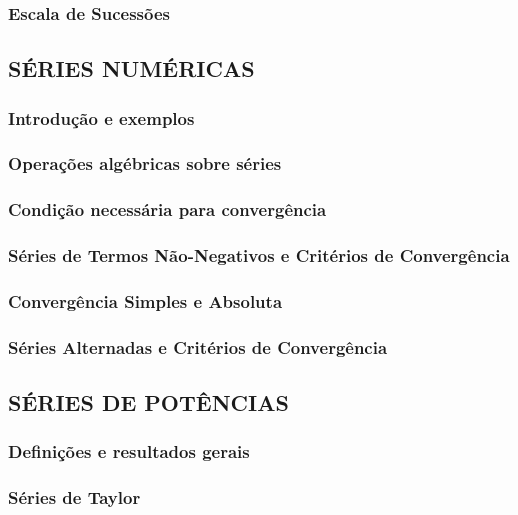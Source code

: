 \documentclass[11pt]{article}
\begin{document}
\subsubsection{Escala de Sucessões}

\subsection{\MakeUppercase{Séries Numéricas}}

\subsubsection{Introdução e exemplos}

\subsubsection{Operações algébricas sobre séries}

\subsubsection{Condição necessária para convergência}

\subsubsection{Séries de Termos Não-Negativos e Critérios de Convergência}

\subsubsection{Convergência Simples e Absoluta}

\subsubsection{Séries Alternadas e Critérios de Convergência}

\subsection{\MakeUppercase{Séries de Potências}}

\subsubsection{Definições e resultados gerais}

\subsubsection{Séries de Taylor}
\end{document}
